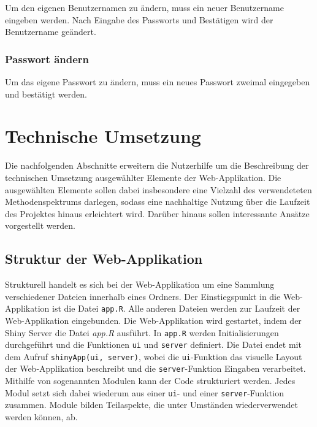 \documentclass[
]{article}
\begin{document}
Um den eigenen Benutzernamen zu ändern, muss ein neuer Benutzername eingeben werden. Nach Eingabe des Passworts und Bestätigen wird der Benutzername geändert.

\hypertarget{passwort-uxe4ndern}{%
\subsubsection{Passwort ändern}\label{passwort-uxe4ndern}}

Um das eigene Passwort zu ändern, muss ein neues Passwort zweimal eingegeben und bestätigt werden.

\hypertarget{technical-guide}{%
\section{Technische Umsetzung}\label{technical-guide}}

Die nachfolgenden Abschnitte erweitern die Nutzerhilfe um die Beschreibung der technischen Umsetzung ausgewählter Elemente der Web-Applikation. Die ausgewählten Elemente sollen dabei insbesondere eine Vielzahl des verwendeteten Methodenspektrums darlegen, sodass eine nachhaltige Nutzung über die Laufzeit des Projektes hinaus erleichtert wird. Darüber hinaus sollen interessante Ansätze vorgestellt werden.

\hypertarget{struktur-der-web-applikation}{%
\subsection{Struktur der Web-Applikation}\label{struktur-der-web-applikation}}

Strukturell handelt es sich bei der Web-Applikation um eine Sammlung verschiedener Dateien innerhalb eines Ordners. Der Einstiegspunkt in die Web-Applikation ist die Datei \texttt{app.R}. Alle anderen Dateien werden zur Laufzeit der Web-Applikation eingebunden. Die Web-Applikation wird gestartet, indem der Shiny Server die Datei \emph{app.R} ausführt. In \texttt{app.R} werden Initialisierungen durchgeführt und die Funktionen \texttt{ui} und \texttt{server} definiert. Die Datei endet mit dem Aufruf \texttt{shinyApp(ui,\ server)}, wobei die \texttt{ui}-Funktion das visuelle Layout der Web-Applikation beschreibt und die \texttt{server}-Funktion Eingaben verarbeitet. Mithilfe von sogenannten Modulen kann der Code strukturiert werden. Jedes Modul setzt sich dabei wiederum aus einer \texttt{ui}- und einer \texttt{server}-Funktion zusammen. Module bilden Teilaspekte, die unter Umständen wiederverwendet werden können, ab.
\end{document}
